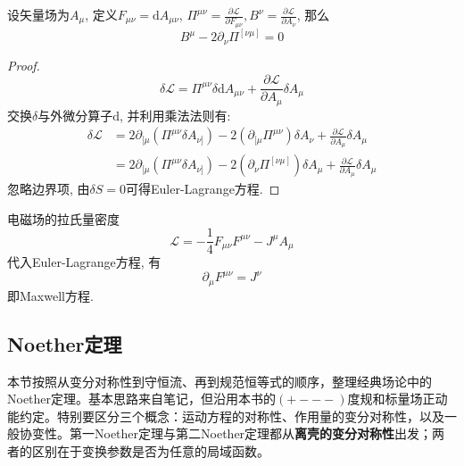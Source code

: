 \begin{theorem}
    设矢量场为$A_\mu$, 
    定义$F_{\mu\nu}=\mathrm dA_{\mu\nu}$, $\Pi^{\mu\nu}=\frac{\partial\mathcal L}{\partial F_{\mu\nu}}, B^\nu=\frac{\partial \mathcal L}{\partial A_\nu}$, 那么
    \begin{equation}
        B^\mu-2\partial_\nu\Pi^{[\nu\mu]}=0
    \end{equation}
\end{theorem}
\begin{proof}
    \begin{equation}
        \delta\mathcal L=\Pi^{\mu\nu}\delta \mathrm dA_{\mu\nu}+\frac{\partial\mathcal L}{\partial A_\mu}\delta A_\mu
    \end{equation}
    交换$\delta$与外微分算子$\mathrm d$, 并利用乘法法则有:
    \begin{subequations}
        \begin{align}
            \delta\mathcal L&=2\partial_{[\mu}(\Pi^{\mu\nu}\delta A_{\nu]})-2(\partial_{[\mu}\Pi^{\mu\nu})\delta A_\nu+\frac{\partial\mathcal L}{\partial A_\mu}\delta A_\mu\\
            &=2\partial_{[\mu}(\Pi^{\mu\nu}\delta A_{\nu]})-2(\partial_\nu\Pi^{[\nu\mu]})\delta A_\mu+\frac{\partial\mathcal L}{\partial A_\mu}\delta A_\mu
        \end{align}
    \end{subequations}
    忽略边界项, 由$\delta S=0$可得Euler-Lagrange方程.
\end{proof}
\begin{example}
    电磁场的拉氏量密度
    \begin{equation}
        \mathcal L = -\frac14 F_{\mu\nu}F^{\mu\nu}-J^\mu A_\mu
    \end{equation}
    代入Euler-Lagrange方程, 有
    \begin{equation}
        \partial_\mu F^{\mu\nu} = J^\nu
    \end{equation}
    即Maxwell方程.
\end{example}
\subsection{Noether定理}
\label{sec:classical-noether}
\songti
本节按照从变分对称性到守恒流、再到规范恒等式的顺序，整理经典场论中的Noether定理。基本思路来自笔记\cite{LinkSymmetry2026}，但沿用本书的$(+---)$度规和标量场正动能约定。特别要区分三个概念：运动方程的对称性、作用量的变分对称性，以及一般协变性。第一Noether定理与第二Noether定理都从\textbf{离壳的变分对称性}出发；两者的区别在于变换参数是否为任意的局域函数。

